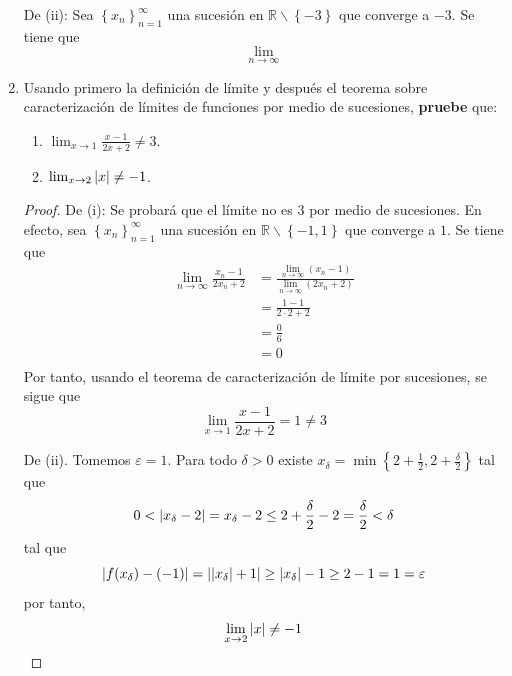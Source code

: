 \documentclass[12pt]{article}
\begin{document}
\begin{enumerate}
\begin{sol}
        De (ii): Sea $\left\{x_n\right\}_{ n=1}^\infty$ una sucesión en $\mathbb{R}\backslash\left\{-3\right\}$ que converge a $-3$. Se tiene que
        \begin{equation*}
            \lim_{ n\rightarrow\infty}
        \end{equation*}
    \end{sol}

    \item Usando primero la definición de límite y después el teorema sobre caracterización de límites de funciones por medio de sucesiones, \textbf{pruebe} que:
    \begin{enumerate}
        \item $\lim_{x\rightarrow1}\frac{x-1}{2x+2}\neq 3$.
        \item $\lim_{x\rightarrow 2}\left| x \right|\neq -1$.
    \end{enumerate}

    \begin{proof}
        De (i): Se probará que el límite no es $3$ por medio de sucesiones. En efecto, sea $\left\{x_n \right\}_{ n=1}^\infty$ una sucesión en $\mathbb{R}\backslash\left\{-1,1 \right\}$ que converge a $1$. Se tiene que
        \begin{equation*}
            \begin{split}
                \lim_{ n\rightarrow\infty}\frac{x_n-1}{2x_n+2}&=\frac{\lim_{ n\rightarrow\infty}(x_n-1)}{\lim_{ n\rightarrow\infty}(2x_n+2)}\\
                &=\frac{1-1}{2\cdot 2+2}\\
                &=\frac{0}{6}\\
                &=0\\
            \end{split}
        \end{equation*}
        Por tanto, usando el teorema de caracterización de límite por sucesiones, se sigue que
        \begin{equation*}
            \lim_{ x\rightarrow 1}\frac{x-1}{2x+2}=1\neq 3
        \end{equation*}

        De (ii). Tomemos $\varepsilon=1$. Para todo $\delta>0$ existe $x_\delta=\min\left\{2+\frac{1}{2},2+\frac{\delta}{2} \right\}$ tal que
        \begin{equation*}
            0<\left| x_\delta-2 \right|=x_\delta-2\leq2+\frac{\delta}{2}-2=\frac{\delta}{2}<\delta
        \end{equation*}
        tal que
        \begin{equation*}
            \left| f(x_\delta)-(-1) \right|=\left| \left| x_\delta \right|+1 \right|\geq \left| x_\delta \right|-1\geq2-1=1=\varepsilon
        \end{equation*}
        por tanto,
        \begin{equation*}
            \lim_{ x\rightarrow 2}\left| x \right|\neq-1
        \end{equation*}
    \end{proof}


\end{enumerate}
\end{document}

